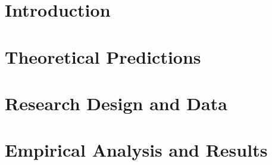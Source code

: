 





\author{Jinmahn Jo}





\tableofcontents
\clearpage

\listoftables
\clearpage

\listoffigures
\clearpage




\section{Introduction}
\label{Section:Introduction}


\section{Theoretical Predictions}
\label{Section:Theoretical-Predictions}


\section{Research Design and Data}
\label{Section:Research-Design-and-Data}


\section{Empirical Analysis and Results}
\label{Section:Empirical-Analysis-and-Results}


